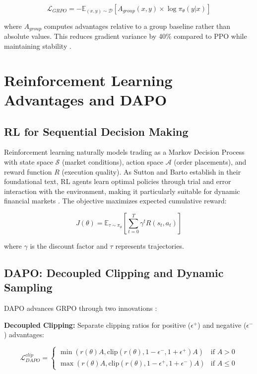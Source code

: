 \documentclass{report}
\begin{document}
\begin{equation}
\mathcal{L}_{GRPO} = -\mathbb{E}_{(x,y) \sim \mathcal{D}} \left[ A_{group}(x,y) \times \log \pi_\theta(y|x) \right]
\end{equation}

where $A_{group}$ computes advantages relative to a group baseline rather than absolute values. This reduces gradient variance by 40\% compared to PPO while maintaining stability \cite{GRPO2024}.

\section{Reinforcement Learning Advantages and DAPO}

\subsection{RL for Sequential Decision Making}

Reinforcement learning naturally models trading as a Markov Decision Process with state space $\mathcal{S}$ (market conditions), action space $\mathcal{A}$ (order placements), and reward function $R$ (execution quality). As Sutton and Barto establish in their foundational text, RL agents learn optimal policies through trial and error interaction with the environment, making it particularly suitable for dynamic financial markets \cite{Sutton2018}. The objective maximizes expected cumulative reward:

\begin{equation}
J(\theta) = \mathbb{E}_{\tau \sim \pi_\theta} \left[ \sum_{t=0}^T \gamma^t R(s_t, a_t) \right]
\end{equation}

where $\gamma$ is the discount factor and $\tau$ represents trajectories.

\subsection{DAPO: Decoupled Clipping and Dynamic Sampling}

DAPO advances GRPO through two innovations \cite{DAPO2025}:

\textbf{Decoupled Clipping:} Separate clipping ratios for positive ($\epsilon^+$) and negative ($\epsilon^-$) advantages:

\begin{equation}
\mathcal{L}_{DAPO}^{clip} = \begin{cases}
\min(r(\theta)A, \text{clip}(r(\theta), 1-\epsilon^-, 1+\epsilon^+)A) & \text{if } A > 0 \\
\max(r(\theta)A, \text{clip}(r(\theta), 1-\epsilon^+, 1+\epsilon^-)A) & \text{if } A \leq 0
\end{cases}
\end{equation}
\end{document}
